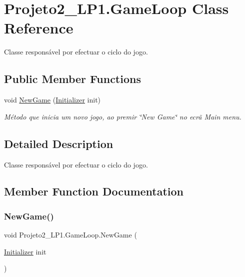 \hypertarget{class_projeto2___l_p1_1_1_game_loop}{}\section{Projeto2\+\_\+\+L\+P1.\+Game\+Loop Class Reference}
\label{class_projeto2___l_p1_1_1_game_loop}


Classe responsável por efectuar o ciclo do jogo.  


\subsection*{Public Member Functions}
\begin{DoxyCompactItemize}
\item 
void \mbox{\hyperlink{class_projeto2___l_p1_1_1_game_loop_abac481edc4ebf5b3f34036d05d0123fc}{New\+Game}} (\mbox{\hyperlink{class_projeto2___l_p1_1_1_initializer}{Initializer}} init)
\begin{DoxyCompactList}\small\item\em Método que inicia um novo jogo, ao premir \char`\"{}\+New Game\char`\"{} no ecrã Main menu. \end{DoxyCompactList}\end{DoxyCompactItemize}


\subsection{Detailed Description}
Classe responsável por efectuar o ciclo do jogo. 



\subsection{Member Function Documentation}
\mbox{\label{class_projeto2___l_p1_1_1_game_loop_abac481edc4ebf5b3f34036d05d0123fc}} 
\subsubsection{\texorpdfstring{New\+Game()}{NewGame()}}
{\footnotesize\ttfamily void Projeto2\+\_\+\+L\+P1.\+Game\+Loop.\+New\+Game (\begin{DoxyParamCaption}\item[{\mbox{\hyperlink{class_projeto2___l_p1_1_1_initializer}{Initializer}}}]{init }\end{DoxyParamCaption})\hspace{0.3cm}{\ttfamily [inline]}}



